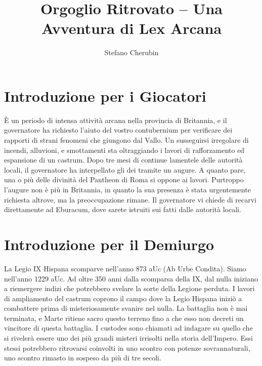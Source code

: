 \documentclass[11.5pt,twocolumn]{article}
\begin{document}
\title{Orgoglio Ritrovato -- Una Avventura di Lex Arcana}

\author{Stefano Cherubin}
\date{}

\maketitle

\section*{Introduzione per i Giocatori}
\`{E} un periodo di intensa attivit\`{a} arcana nella provincia di Britannia, e il governatore ha richiesto l'aiuto del vostro contubernium per verificare dei rapporti di strani fenomeni che giungono dal Vallo.
Un susseguirsi irregolare di incendi, alluvioni, e smottamenti sta oltraggiando i lavori di rafforzamento ed espansione di un castrum.
Dopo tre mesi di continue lamentele delle autorit\`{a} locali, il governatore ha interpellato gli dei tramite un augure.
A quanto pare, una o pi\`{u} delle divinit\`{a} del Pantheon di Roma si oppone ai lavori.
Purtroppo l'augure non \`{e} pi\`{u} in Britannia, in quanto la sua presenza \`{e} stata urgentemente richiesta altrove, ma la preoccupazione rimane.
Il governatore vi chiede di recarvi direttamente ad Eburacum, dove sarete istruiti sui fatti dalle autorit\`{a} locali.

\section*{Introduzione per il Demiurgo}
La Legio IX Hispana scomparve nell'anno 873 aUc (Ab Urbe Condita).
Siamo nell'anno 1229 aUc.
Ad oltre 350 anni dalla scomparsa della IX, dal nulla iniziano a riemergere indizi che potrebbero svelare la sorte della Legione perduta.
I lavori di ampliamento del castrum coprono il campo dove la Legio Hispana inizi\`{o} a combattere prima di misteriosamente svanire nel nulla.
La battaglia non \`{e} mai terminata, e Marte ritiene sacro questo terreno fino a che esso non decreti un vincitore di questa battaglia.
I custodes sono chiamati ad indagare su quello che si riveler\`{a} essere uno dei pi\`{u} grandi misteri irrisolti nella storia dell'Impero.
Essi stessi potrebbero ritrovarsi coinvolti in uno scontro con potenze sovrannaturali, uno scontro rimasto in sospeso da pi\`{u} di tre secoli.
\end{document}
